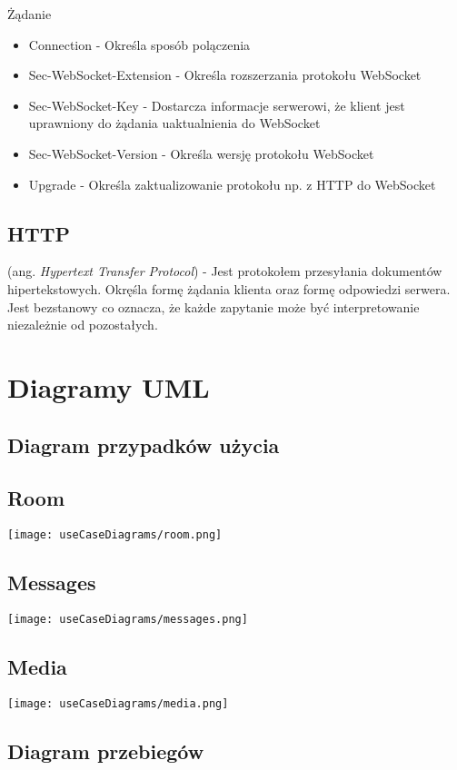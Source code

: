 \documentclass{article}
\begin{document}
Żądanie
\begin{itemize}
  \item Connection - Określa sposób polączenia
  \item Sec-WebSocket-Extension - Określa rozszerzania protokołu WebSocket
  \item Sec-WebSocket-Key - Dostarcza informacje serwerowi, że klient jest uprawniony do żądania uaktualnienia do WebSocket
  \item Sec-WebSocket-Version - Określa wersję protokołu WebSocket
  \item Upgrade - Określa zaktualizowanie protokołu np. z HTTP do WebSocket
\end{itemize}

\subsection{HTTP}
(ang. \emph{Hypertext Transfer Protocol}) - Jest protokołem przesyłania dokumentów hipertekstowych. Okręśla formę żądania klienta oraz formę odpowiedzi serwera. Jest bezstanowy co oznacza, że każde zapytanie może być interpretowanie niezależnie od pozostałych.

\section{Diagramy UML}

\subsection{Diagram przypadków użycia}

\subsection{Room}
\texttt{[image: useCaseDiagrams/room.png]}

\subsection{Messages}
\texttt{[image: useCaseDiagrams/messages.png]}

\subsection{Media}
\texttt{[image: useCaseDiagrams/media.png]}

\subsection{Diagram przebiegów}
\end{document}
